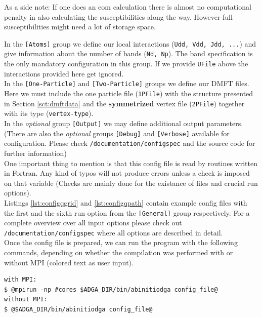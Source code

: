 \documentclass[a4paper,11pt]{article}
\numberwithin{equation}{section} %
\begin{document}
As a side note: If one does an eom calculation there is almost no computational penalty in also calculating the susceptibilities along the way.
However full susceptibilities might need a lot of storage space.

\newpage
In the {\color{red} \verb|[Atoms]|} group we define our local interactions (\verb+Udd, Vdd, Jdd, ...+) and
give information about the number of bands (\verb+Nd, Np+). The band specification is the only mandatory configuration in this group. If we provide \verb+UFile+ above the interactions provided here get ignored.
\\[\baselineskip]
In the {\color{red} \verb|[One-Particle]|} and {\color{red} \verb|[Two-Particle]|} groups we define our DMFT files. Here we must include the one particle file (\verb+1PFile+) with the structure presented in Section \ref{sct:dmftdata} and the \textbf{symmetrized} vertex file (\verb+2PFile+) together with its type (\verb+vertex-type+).
\\[\baselineskip]
In the \emph{optional} group {\color{red} \verb|[Output]|} we may define additional output parameters. (There are also the \emph{optional} groups {\color{red} \verb+[Debug]+} and {\color{red} \verb+[Verbose]+} available for configuration. Please check {\color{blue} \verb+/documentation/configspec+} and the source code for further information)
\\[\baselineskip]
One important thing to mention is that this config file is read by routines written in Fortran.
Any kind of typos will not produce errors unless a check is imposed
on that variable (Checks are mainly done for the existance of files and crucial run options).
\\[2\baselineskip]
Listings \ref{lst:configqgrid} and \ref{lst:configqpath} contain example config files with the first and the sixth run option from the {\color{red} \verb+[General]+} group respectively.
For a complete overview over all input options please check out
{\color{blue}\verb|/documentation/configspec|} where all options are described in detail.
\\[\baselineskip]
Once the config file is prepared, we can run the program with the following commands, depending on whether the compilation was performed with or without MPI (colored text as user input).

\begin{lstlisting}[caption=abinitiodga run commands, frame=single, basicstyle=\small, style=base]
with MPI:
$ @mpirun -np #cores $ADGA_DIR/bin/abinitiodga config_file@
without MPI:
$ @$ADGA_DIR/bin/abinitiodga config_file@
\end{lstlisting}
\end{document}
